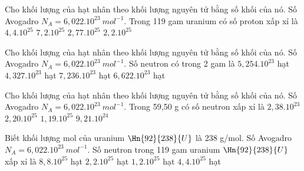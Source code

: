 \begin{vidu}%
	Cho khối lượng của hạt nhân theo khối lượng nguyên tử bằng số khối của nó. Số Avogadro $N_A=6,022.10^{23}\ mol^{-1}$. Trong 119 gam uranium  có số proton xấp xỉ là
	\choice
	{$4,4.10^{25}$}
	{$7,2.10^{25}$}
	{\True $2,77.10^{25}$}
	{$2,2.10^{25}$}
\end{vidu}
\begin{vidu}%
	Cho khối lượng của hạt nhân theo khối lượng nguyên tử bằng số khối của nó. Số Avogadro $N_A=6,022.10^{23}\ mol^{-1}$. Số neutron có trong 2 gam  là 
	\choice
	{$5,254.10^{23}$ hạt}
	{$4,327.10^{23}$ hạt} 
	{$7,236.10^{23}$ hạt}
	{\True$6,622.10^{23}$ hạt}
\end{vidu}
\begin{vidu}%
	Cho khối lượng của hạt nhân theo khối lượng nguyên tử bằng số khối của nó. Số Avogadro $N_A=6,022.10^{23}\ mol^{-1}$. Trong 59,50 g  có số neutron xấp xỉ là
	\choice
	{$2,38.10^{23}$}
	{\True $2,20.10^{25}$}
	{$1,19.10^{25}$}
	{$9,21.10^{24}$}
\end{vidu}
\begin{vidu}%
	Biết khối lượng mol của uranium $\Hn{92}{238}{U}$ là 238 g/mol. Số Avogadro $N_A=6,022.10^{23}\ mol^{-1}$. Số neutron trong 119 gam uranium $\Hn{92}{238}{U}$ xấp xỉ là
	\choice
	{$8,8.10^{25}$ hạt}
	{$2,2.10^{25}$ hạt}
	{$1,2.10^{25}$ hạt}
	{\True $4,4.10^{25}$ hạt}
\end{vidu}
